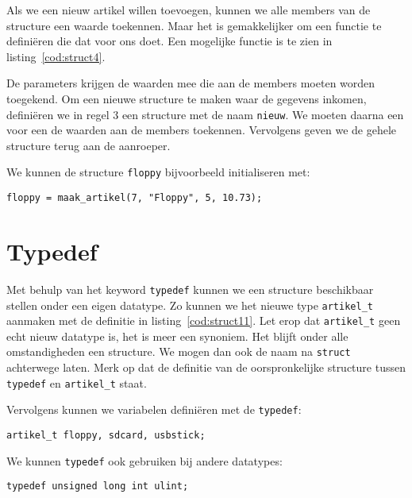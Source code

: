 
Als we een nieuw artikel willen toevoegen, kunnen we alle members van de structure een waarde toekennen. Maar het is gemakkelijker om een functie te definiëren die dat voor ons doet. Een mogelijke functie is te zien in listing~\ref{cod:struct4}.


De parameters krijgen de waarden mee die aan de members moeten worden toegekend. Om een nieuwe structure te maken waar de gegevens inkomen, definiëren we in regel 3 een structure met de naam \texttt{nieuw}. We moeten daarna een voor een de waarden aan de members toekennen. Vervolgens geven we de gehele structure terug aan de aanroeper.

We kunnen de structure \texttt{floppy} bijvoorbeeld initialiseren met:

\hspace*{1em}\texttt{floppy = maak\_artikel(7, "Floppy", 5, 10.73);}

\section{Typedef}
Met behulp van het keyword \texttt{typedef} kunnen we een structure beschikbaar stellen onder een eigen datatype. Zo kunnen we het nieuwe type \texttt{artikel\_t} aanmaken met de definitie in listing~\ref{cod:struct11}. Let erop dat \texttt{artikel\_t} geen echt nieuw datatype is, het is meer een synoniem. Het blijft onder alle omstandigheden een structure. We mogen dan ook de naam na \texttt{struct} achterwege laten. Merk op dat de definitie van de oorspronkelijke structure tussen \texttt{typedef} en \texttt{artikel\_t} staat.


Vervolgens kunnen we variabelen definiëren met de \texttt{typedef}:

\hspace*{1em}\texttt{artikel\_t floppy, sdcard, usbstick;}

We kunnen \texttt{typedef} ook gebruiken bij andere datatypes:

\hspace*{1em}\texttt{typedef unsigned long int ulint;}

